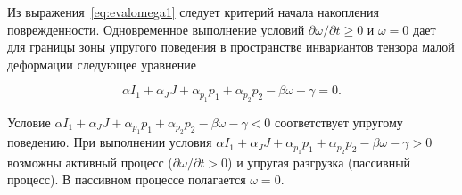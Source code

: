 Из выражения~\eqref{eq:evalomega1} следует критерий начала накопления поврежденности. Одновременное выполнение условий $\partial \omega / \partial t \geq 0$ и $\omega = 0$ дает для границы зоны упругого поведения в пространстве инвариантов тензора малой деформации следующее уравнение

\begin{equation}
  \label{eq:eq34}
  \alpha I_1 + \alpha_J J + \alpha_{p_1} p_1 + \alpha_{p_2} p_2 -\beta \omega - \gamma = 0.
\end{equation}

Условие $\alpha I_1 + \alpha_J J + \alpha_{p_1} p_1 + \alpha_{p_2} p_2 -\beta \omega - \gamma < 0$ соответствует упругому поведению. При выполнении условия  $\alpha I_1 + \alpha_J J + \alpha_{p_1} p_1 + \alpha_{p_2} p_2 -\beta \omega - \gamma > 0$ возможны активный процесс ($\partial \omega / \partial t > 0$) и упругая разгрузка (пассивный процесс). В пассивном процессе полагается $\omega = 0$.










